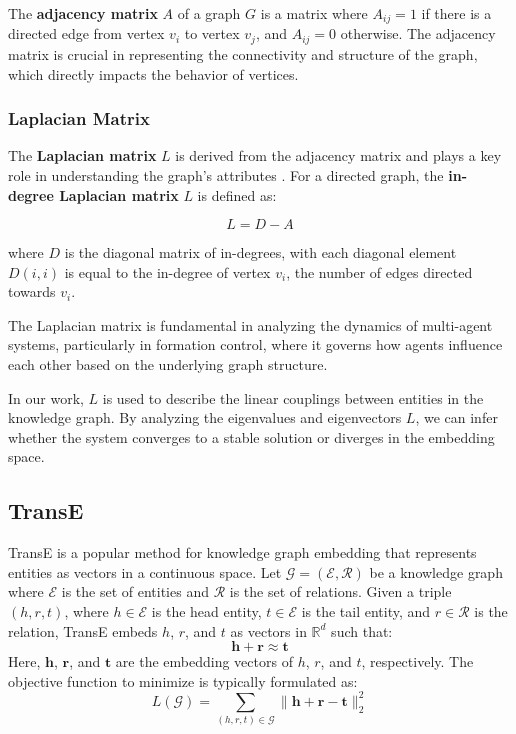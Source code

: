 \documentclass[letterpaper, 10 pt, conference]{ieeeconf}  %
\begin{document}
The \textbf{adjacency matrix} \( A \) of a graph \( G \) is a matrix where \( A_{ij} = 1 \) if there is a directed edge from vertex \( v_i \) to vertex \( v_j \), and \( A_{ij} = 0 \) otherwise. The adjacency matrix is crucial in representing the connectivity and structure of the graph, which directly impacts the behavior of vertices.

\subsubsection{Laplacian Matrix}

The \textbf{Laplacian matrix} \( L \) is derived from the adjacency matrix and plays a key role in understanding the graph's attributes \cite{mirzaev_laplacian_2013}. For a directed graph, the \textbf{in-degree Laplacian matrix} \( L \) is defined as:

\[
L = D - A
\]

\noindent where \( D \) is the diagonal matrix of in-degrees, with each diagonal element \( D(i, i) \) is equal to the in-degree of vertex \( v_i \), the number of edges directed towards \( v_i \).

\noindent The Laplacian matrix is fundamental in analyzing the dynamics of multi-agent systems, particularly in formation control, where it governs how agents influence each other based on the underlying graph structure.

In our work, $L$ is used to describe the linear couplings between entities in the knowledge graph. By analyzing the eigenvalues and eigenvectors $L$, we can infer whether the system converges to a stable solution or diverges in the embedding space.

\subsection{TransE}
TransE \cite{bordes_translating_2013} is a popular method for knowledge graph embedding that represents entities as vectors in a continuous space. Let $\mathcal{G} = (\mathcal{E}, \mathcal{R})$ be a knowledge graph where $\mathcal{E}$ is the set of entities and $\mathcal{R}$ is the set of relations. Given a triple $(h, r, t)$, where $h \in \mathcal{E}$ is the head entity, $t \in \mathcal{E}$ is the tail entity, and $r \in \mathcal{R}$ is the relation, TransE embeds $h$, $r$, and $t$ as vectors in $\mathbb{R}^d$ such that:
\[
\mathbf{h} + \mathbf{r} \approx \mathbf{t}
\]
Here, $\mathbf{h}$, $\mathbf{r}$, and $\mathbf{t}$ are the embedding vectors of $h$, $r$, and $t$, respectively. The objective function to minimize is typically formulated as:
\[
L(\mathcal{G}) = \sum_{(h,r,t) \in \mathcal{G}} \|\mathbf{h} + \mathbf{r} - \mathbf{t}\|_2^2
\]
\end{document}
